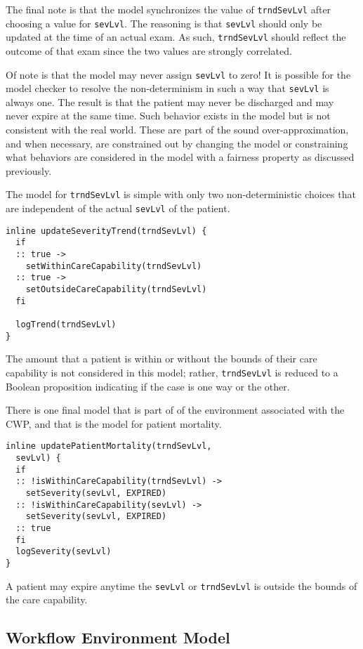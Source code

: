 The final note is that the model synchronizes the value of \texttt{trndSevLvl} after choosing a value for \texttt{sevLvl}. The reasoning is that \texttt{sevLvl} should only be updated at the time of an actual exam. As such, \texttt{trndSevLvl} should reflect the outcome of that exam since the two values are strongly correlated.

Of note is that the model may never assign \texttt{sevLvl} to zero! It is possible for the model checker to resolve the non-determinism in such a way that \texttt{sevLvl} is always one. The result is that the patient may never be discharged and may never expire at the same time. Such behavior exists in the model but is not consistent with the real world. These are part of the sound over-approximation, and when necessary, are constrained out by changing the model or constraining what behaviors are considered in the model with a fairness property as discussed previously.

The model for \texttt{trndSevLvl} is simple with only two non-deterministic choices that are independent of the actual \texttt{sevLvl} of the patient. 
%
{\small
\begin{lstlisting}[style=myPromela]
inline updateSeverityTrend(trndSevLvl) {
  if
  :: true -> 
    setWithinCareCapability(trndSevLvl)
  :: true -> 
    setOutsideCareCapability(trndSevLvl)
  fi

  logTrend(trndSevLvl)
}
\end{lstlisting}
}
%
\noindent The amount that a patient is within or without the bounds of their care capability is not considered in this model; rather, \texttt{trndSevLvl} is reduced to a Boolean proposition indicating if the case is one way or the other.

There is one final model that is part of of the environment associated with the CWP, and that is the model for patient mortality. 
%
{\small
\begin{lstlisting}[style=myPromela]
inline updatePatientMortality(trndSevLvl, 
  sevLvl) {
  if
  :: !isWithinCareCapability(trndSevLvl) -> 
    setSeverity(sevLvl, EXPIRED)
  :: !isWithinCareCapability(sevLvl) ->
    setSeverity(sevLvl, EXPIRED)
  :: true
  fi
  logSeverity(sevLvl)
}
\end{lstlisting}
}
%
\noindent A patient may expire anytime the \texttt{sevLvl} or \texttt{trndSevLvl} is outside the bounds of the care capability.

\subsection{Workflow Environment Model}

